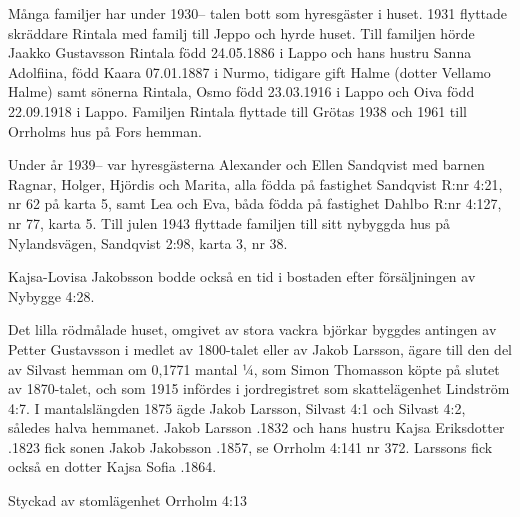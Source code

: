 
Många familjer har under 1930-- talen bott som hyresgäster i huset. 1931 flyttade skräddare Rintala med familj till Jeppo och hyrde huset. Till familjen hörde Jaakko Gustavsson Rintala född 24.05.1886 i Lappo och hans hustru Sanna Adolfiina, född Kaara 07.01.1887 i Nurmo, tidigare gift Halme (dotter Vellamo Halme) samt sönerna Rintala, Osmo född 23.03.1916 i Lappo och Oiva född 22.09.1918 i Lappo. Familjen Rintala flyttade till Grötas 1938 och 1961 till Orrholms hus på Fors hemman.

Under år 1939-- var hyresgästerna Alexander och Ellen Sandqvist med barnen Ragnar, Holger, Hjördis och Marita, alla födda på fastighet Sandqvist R:nr 4:21, nr 62 på karta 5, samt Lea och Eva, båda födda på fastighet Dahlbo R:nr 4:127, nr 77, karta 5.	Till julen 1943 flyttade familjen till sitt nybyggda hus på Nylandsvägen, Sandqvist 2:98, karta 3, nr 38.

Kajsa-Lovisa Jakobsson bodde också en tid i bostaden efter försäljningen av Nybygge 4:28.

Det lilla rödmålade huset, omgivet av stora vackra björkar byggdes antingen av Petter Gustavsson i medlet av 1800-talet eller av Jakob Larsson, ägare till den del av Silvast hemman om 0,1771 mantal ¼, som Simon Thomasson köpte på slutet av 1870-talet, och som 1915 infördes i jordregistret som skattelägenhet Lindström 4:7. I mantalslängden 1875 ägde Jakob Larsson, Silvast 4:1 och Silvast 4:2, således halva hemmanet.	Jakob Larsson .1832 och hans hustru Kajsa Eriksdotter .1823 fick sonen Jakob Jakobsson .1857, se Orrholm 	4:141 nr 372. Larssons fick också en dotter Kajsa Sofia .1864.



%

Styckad av stomlägenhet Orrholm 4:13


